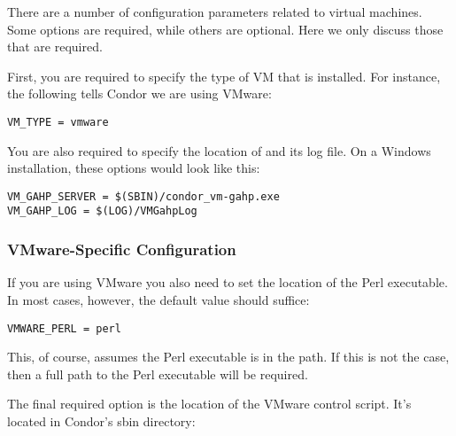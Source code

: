 There are a number of configuration parameters related to virtual
machines. Some options are required, while others are 
optional.  Here we only discuss those that are required.

First, you are required to specify the type of VM that is installed. 
For instance, the following tells Condor we are using VMware:

\begin{verbatim}
VM_TYPE = vmware
\end{verbatim}

You are also required to specify the location of  and
its log file.
On a Windows installation, these options would look like this:

\begin{verbatim}
VM_GAHP_SERVER = $(SBIN)/condor_vm-gahp.exe
VM_GAHP_LOG = $(LOG)/VMGahpLog
\end{verbatim}





\subsubsection{VMware-Specific Configuration}

If you are using VMware you also need to set the location of the Perl 
executable.  In most cases, however, the default value should suffice:

\begin{verbatim}
VMWARE_PERL = perl
\end{verbatim}

This, of course, assumes the Perl executable is in the path.  If this is not 
the case, then a full path to the Perl executable will be required.

The final required option is the location of the VMware control script. It's
located in Condor's sbin directory:

